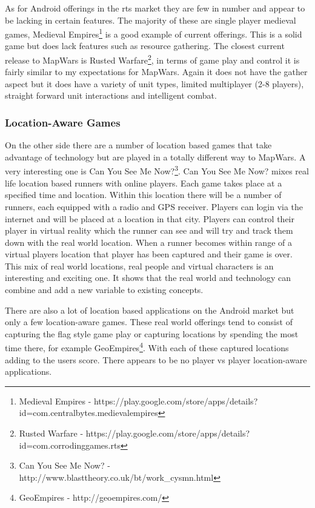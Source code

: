 \documentclass[11pt,fleqn,twoside]{article}
\begin{document}
As for Android offerings in the \gls{rts} market they are few in number and appear to be lacking in certain features. The majority of these are single player medieval games, Medieval Empires\footnote{Medieval Empires - https://play.google.com/store/apps/details?id=com.centralbytes.medievalempires} is a good example of current offerings. This is a solid game but does lack features such as resource gathering. The closest current release to MapWars is Rusted Warfare\footnote{Rusted Warfare - https://play.google.com/store/apps/details?id=com.corrodinggames.rts}, in terms of game play and control it is fairly similar to my expectations for MapWars. Again it does not have the gather aspect but it does have a variety of unit types, limited multiplayer (2-8 players), straight forward unit interactions and intelligent combat. 

\subsubsection{Location-Aware Games}
On the other side there are a number of location based games that take advantage of technology but are played in a totally different way to MapWars. A very interesting one is Can You See Me Now?\footnote{Can You See Me Now? - http://www.blasttheory.co.uk/bt/work\_cysmn.html}. Can You See Me Now? mixes real life location based runners with online players. Each game takes place at a specified time and location. Within this location there will be a number of runners, each equipped with a radio and GPS receiver. Players can login via the internet and will be placed at a location in that city. Players can control their player in virtual reality which the runner can see and will try and track them down with the real world location. When a runner becomes within range of a virtual players location that player has been captured and their game is over. This mix of real world locations, real people and virtual characters is an interesting and exciting one. It shows that the real world and technology can combine and add a new variable to existing concepts.

There are also a lot of location based applications on the Android market but only a few location-aware games. These real world offerings tend to consist of capturing the flag style game play or capturing locations by spending the most time there, for example GeoEmpires\footnote{GeoEmpires - http://geoempires.com/}. With each of these captured locations adding to the users score. There appears to be no player vs player location-aware applications.
\end{document}
